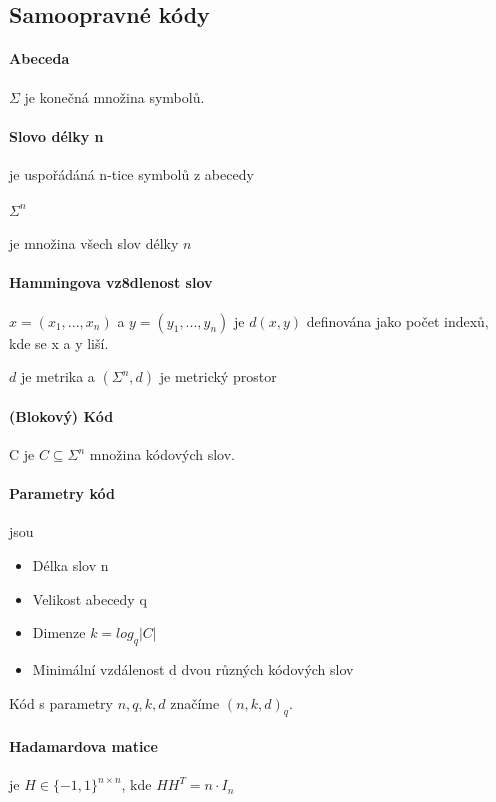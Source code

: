 \documentclass[10pt,a4paper]{article}
\theoremstyle{plain}
\begin{document}
\subsection{Samoopravné kódy}

\paragraph{Abeceda} $\Sigma$ je konečná množina symbolů.
\paragraph{Slovo délky n} je uspořádáná n-tice symbolů z abecedy
\paragraph{ $\Sigma^n$ } je množina všech slov délky $n$
\paragraph{Hammingova vz8dlenost slov} $x=(x_1,...,x_n)$ a $y=(y_1,...,y_n)$ je $d(x,y)$ definována jako počet indexů, kde se x a y liší. 

$d$ je metrika a  $(\Sigma^n, d)$ je metrický prostor

\paragraph{(Blokový) Kód} C je $C \subseteq \Sigma^n$ množina kódových slov.

\paragraph{Parametry kód} jsou \begin{itemize}
\item Délka slov n
\item Velikost abecedy q
\item Dimenze $k = log_q|C|$
\item Minimální vzdálenost d dvou různých kódových slov
\end{itemize}  

Kód s parametry $n,q,k,d$ značíme $(n,k,d)_q$.

\paragraph{Hadamardova matice} je $H \in \{-1,1\}^{n\times n}$, kde $HH^T = n \cdot I_n$
\end{document}
